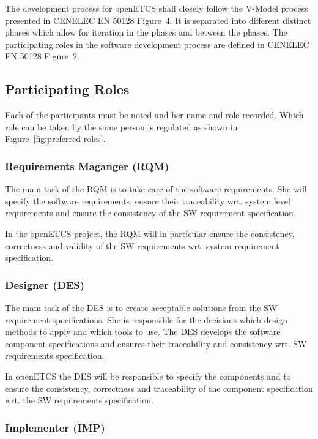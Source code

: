
The development process for openETCS shall closely follow the V-Model process
presented in CENELEC EN 50128 Figure~4. It is separated into different distinct phases
which allow for iteration in the phases and between the phases. The
participating roles in the software development process are defined in CENELEC
EN 50128 Figure~2.

\subsection{Participating Roles}
\label{sec:participating-roles}

Each of the participants must be noted and her name and role recorded. Which
role can be taken by the same person is regulated as shown in
Figure~\ref{fig:preferred-roles}.

\subsubsection{Requirements Maganger (RQM)}
\label{sec:requ-magang-rqm}

The main task of the RQM is to take care of the software requirements. She will
specify the software requirements, ensure their traceability wrt. system level
requirements and ensure the consistency of the SW requirement specification.

In the openETCS project, the RQM will in particular ensure the consistency,
correctness and validity of the SW requirements wrt. system requirement
specification.

\subsubsection{Designer (DES)}
\label{sec:designer}

The main task of the DES is to create acceptable solutions from the SW
requirement specifications. She is responsible for the decisions which design
methods to apply and which tools to use. The DES develops the software component
specifications and ensures their traceability and consistency wrt. SW
requirements specification.

In openETCS the DES will be responsible to specify the components and to ensure
the consistency, correctness and traceability of the component specification
wrt. the SW requirements specification.

\subsubsection{Implementer (IMP)}
\label{sec:implementer}

